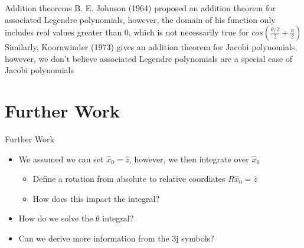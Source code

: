 \documentclass{beamer}
\begin{document}
    \begin{frame}{Addition theorems}
        B. E. Johnson (1964) proposed an addition theorem for associated Legendre polynomials, however, the domain of his function only includes real values greater than 0, which is
        not necessarily true for $cos(\frac{\theta/2}{2} + \frac{\pi}{2})$\\
        Similarly, Koornwinder (1973) gives an addition theorem for Jacobi polynomials, however, we don't believe associated Legendre polynomials are a special case of Jacobi polynomials
    \end{frame}
        
    \section{Further Work}

    \begin{frame}{Further Work}
        \begin{itemize}
            \item We assumed we can set $\hat x_0 = \hat z$, however, we then integrate over $\hat x_0$
            \begin{itemize}
                \item Define a rotation from absolute to relative coordiates $R\hat x_0 = \hat z$
                \item How does this impact the integral?
            \end{itemize}
            \item How do we solve the $\theta$ integral?
            \item Can we derive more information from the 3j symbols?
        \end{itemize}

    \end{frame}
\end{document}
